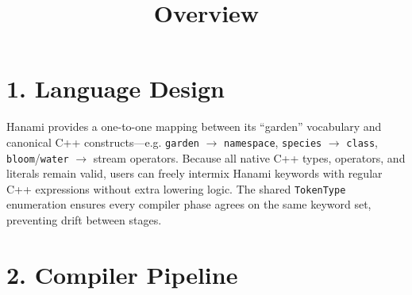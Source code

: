 \documentclass[a4paper,12pt]{article}
\title{Overview}
\author{}
\date{}
\begin{document}
\maketitle

\section*{1. Language Design}

Hanami provides a one-to-one mapping between its “garden” vocabulary and canonical C++ constructs—e.g. \texttt{garden} $\rightarrow$ \texttt{namespace}, \texttt{species} $\rightarrow$ \texttt{class}, \texttt{bloom}/\texttt{water} $\rightarrow$ stream operators. Because all native C++ types, operators, and literals remain valid, users can freely intermix Hanami keywords with regular C++ expressions without extra lowering logic. The shared \texttt{TokenType} enumeration ensures every compiler phase agrees on the same keyword set, preventing drift between stages.

\section*{2. Compiler Pipeline}
\end{document}
